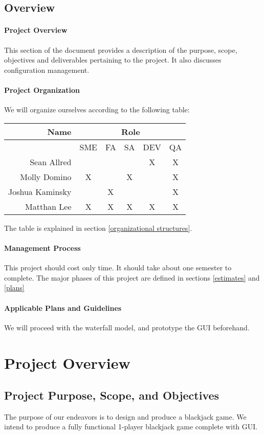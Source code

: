 \documentclass{article}
\begin{document}
\subsection{Overview}
\paragraph{Project Overview}

This section of the document provides a description of the purpose, scope, objectives and deliverables pertaining to the project.  It also discusses configuration management.
\paragraph{Project Organization} We will organize ourselves according to the following table:
\\
\begin{tabular}{|r|c|c|c|c|c|}
\hline
Name & \multicolumn{5}{|c|}{Role}\\\hline
& SME & FA & SA& DEV& QA \\\hline
Sean Allred&  &  & & X & X \\\hline
Molly Domino & X &  & X& & X \\\hline
Joshua Kaminsky &  & X & & & X\\\hline
Matthan Lee & X & X & X & X& X \\\hline
\end{tabular}

\vspace{12 pt}
The table is explained in section \ref{organizational structures}.

\paragraph{Management Process} This project should cost only time.  It should take about one semester to complete.  The major phases of this project are defined in sections \ref{estimates} and \ref{plans}
\paragraph{Applicable Plans and Guidelines} We will proceed with the waterfall model, and prototype the GUI beforehand.
\section{Project Overview}
\subsection{Project Purpose, Scope, and Objectives}
The purpose of our endeavors is to design and produce a blackjack game.  We intend to produce a fully functional 1-player blackjack game complete with GUI.
\end{document}
